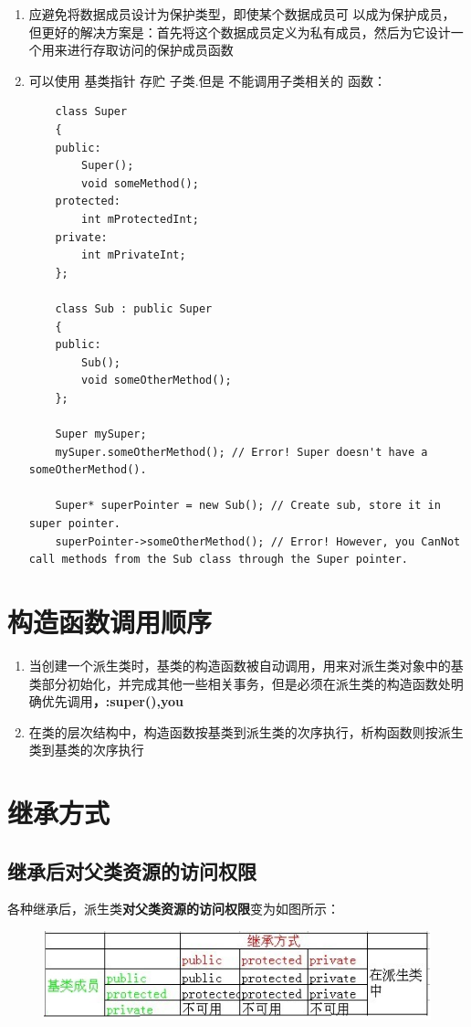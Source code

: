 \documentclass[UTF8,a4paper,12pt]{ctexbook} %
\begin{document}
\begin{enumerate}[fullwidth,itemindent=2em,label=(\arabic*)]
	       \item 应避免将数据成员设计为保护类型，即使某个数据成员可 以成为保护成员，但更好的解决方案是：首先将这个数据成员定义为私有成员，然后为它设计一个用来进行存取访问的保护成员函数
	      
	       \item 可以使用 基类指针 存贮 子类.但是 不能调用子类相关的 函数：
		       \begin{lstlisting}
	class Super
	{
	public:
		Super();
		void someMethod();
	protected:
		int mProtectedInt;
	private:
		int mPrivateInt;
	};
	
	class Sub : public Super
	{
	public:
		Sub();
		void someOtherMethod();
	};
	
	Super mySuper;
	mySuper.someOtherMethod(); // Error! Super doesn't have a someOtherMethod().
	
	Super* superPointer = new Sub(); // Create sub, store it in super pointer.
	superPointer->someOtherMethod(); // Error! However, you CanNot call methods from the Sub class through the Super pointer. 
		       \end{lstlisting}
	       \end{enumerate}
     
	\section{构造函数调用顺序}
	       \begin{enumerate}[fullwidth,itemindent=2em,label=(\arabic*)]
	       	 \item 当创建一个派生类时，基类的构造函数被自动调用，用来对派生类对象中的基类部分初始化，并完成其他一些相关事务，但是必须在派生类的构造函数处明确优先调用\textbf{，:super(),you}
	       	 \item 在类的层次结构中，构造函数按基类到派生类的次序执行，析构函数则按派生类到基类的次序执行
	       \end{enumerate}
 
	\section{继承方式}
		\subsection{继承后对父类资源的访问权限}
			各种继承后，派生类\textbf{对父类资源的访问权限}变为如图所示：
			\begin{figure}[H]
				\centering 
				\includegraphics[scale = 0.8]{derive.png}
			\end{figure}   
			   
\end{document}
